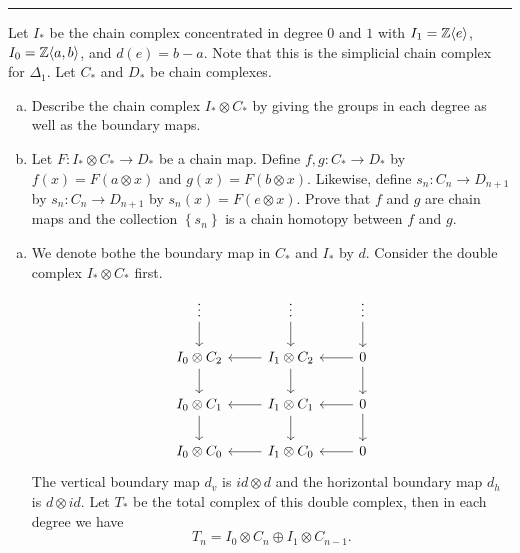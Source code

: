 \documentclass[a4paper, 12pt]{article}
\begin{document}
\noindent\rule{7in}{2.8pt}
\begin{problem}{2}
Let \(I_*\) be the chain complex concentrated in degree \(0\) and \(1\) with \(I_1=\mathbb{Z}\langle e\rangle\), \(I_0=\mathbb{Z}\langle a,b\rangle\), and \(d(e)=b-a\). Note that this is the 
simplicial chain complex for \(\Delta_1\). Let \(C_*\) and \(D_*\) be chain complexes. 
\begin{enumerate}[(a)]
\item Describe the chain complex \(I_*\otimes C_*\) by giving the groups in each degree as well as the boundary maps.
\item Let \(F:I_*\otimes C_*\rightarrow D_*\) be a chain map. Define \(f,g:C_*\rightarrow D_*\) by \(f(x)=F(a\otimes x)\) and \(g(x)=F(b\otimes x)\). Likewise, define \(s_n:C_n\rightarrow D_{n+1}\) by \(s_n:C_n\rightarrow D_{n+1}\) by \(s_n(x)=F(e\otimes x)\). Prove 
that \(f\) and \(g\) are chain maps and the collection \(\left\{ s_n \right\}\) is a chain homotopy between \(f\) and \(g\). 
\end{enumerate}
\end{problem}
\begin{solution}
\begin{enumerate}[(a)]
\item We denote bothe the boundary map in \(C_*\) and \(I_*\) by \(d\). Consider the double complex \(I_*\otimes C_*\) first.
\[\begin{tikzcd}
	\vdots & \vdots & \vdots \\
	{I_0\otimes C_2} & {I_1\otimes C_2} & 0 \\
	{I_0\otimes C_1} & {I_1\otimes C_1} & 0 \\
	{I_0\otimes C_0} & {I_1\otimes C_0} & 0
	\arrow[from=1-1, to=2-1]
	\arrow[from=1-2, to=2-2]
	\arrow[from=1-3, to=2-3]
	\arrow[from=2-1, to=3-1]
	\arrow[from=2-2, to=2-1]
	\arrow[from=2-2, to=3-2]
	\arrow[from=2-3, to=2-2]
	\arrow[from=2-3, to=3-3]
	\arrow[from=3-1, to=4-1]
	\arrow[from=3-2, to=3-1]
	\arrow[from=3-2, to=4-2]
	\arrow[from=3-3, to=3-2]
	\arrow[from=3-3, to=4-3]
	\arrow[from=4-2, to=4-1]
	\arrow[from=4-3, to=4-2]
\end{tikzcd}\]
The vertical boundary map \(d_v\) is \(id\otimes d\) and the horizontal boundary map \(d_h\) is \(d\otimes id\). Let \(T_*\) be the total complex of this double complex, then in each degree we have 
\[T_n=I_0\otimes C_n\oplus I_1\otimes C_{n-1}.\]


\end{enumerate}
\end{solution}
\end{document}
